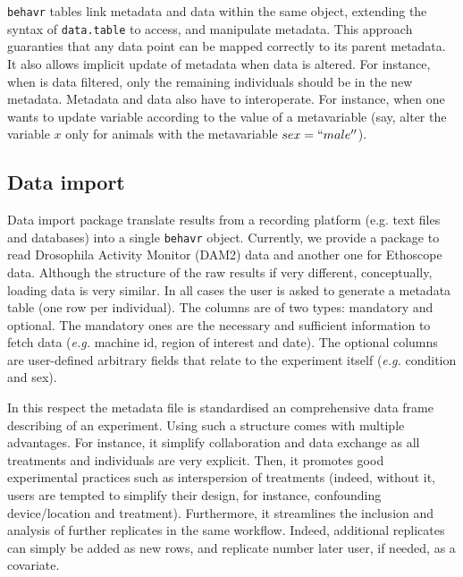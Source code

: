 \documentclass[10pt,letterpaper]{article}
\begin{document}
\texttt{behavr} tables link metadata and data within the same object, extending the syntax of \texttt{data.table} to access, and manipulate metadata.
This approach guaranties that any data point can be mapped correctly to its parent metadata.
It also allows implicit update of metadata when data is altered.
For instance, when is data filtered, only the remaining individuals should be in the new metadata. 
Metadata and data also have to interoperate.
For instance, when one wants to update variable according to the value of a metavariable (say, alter the variable $x$ only for animals with the metavariable $sex=``male''$).


\subsection*{Data import}
Data import package translate results from a recording platform (e.g. text files and databases) into a single \texttt{behavr} object.
Currently, we provide a package to read Drosophila Activity Monitor (DAM2) data  and another one for Ethoscope data.
Although the structure of the raw results if very different, conceptually, loading data is very similar.
In all cases the user is asked to generate a metadata table (one row per individual). 
The columns are of two types: mandatory and optional.
The mandatory ones are the necessary and sufficient information to fetch data (\emph{e.g.} machine id, region of interest and date). 
The optional columns are user-defined arbitrary fields that relate to the experiment itself (\emph{e.g.} condition and sex).

In this respect the metadata file is standardised an comprehensive data frame describing of an experiment.
Using such a structure comes with multiple advantages.
For instance, it simplify collaboration and data exchange as all treatments and individuals are very explicit.
Then, it promotes good experimental practices such as interspersion of treatments (indeed, without it, users are tempted to simplify their design, for instance, confounding device/location and treatment).
Furthermore, it streamlines the inclusion and analysis of further replicates in the same workflow. Indeed, additional replicates can simply be added as new rows, and replicate number later user, if needed, as a covariate.	
\end{document}
